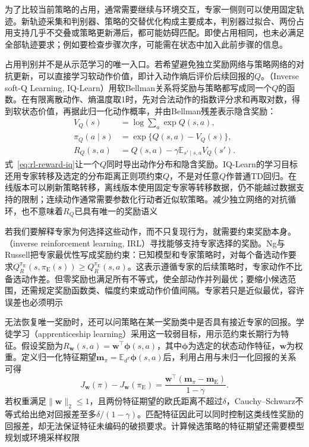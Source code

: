 为了比较当前策略的占用，通常需要继续与环境交互，专家一侧则可以使用固定轨迹。新轨迹采集和判别器、策略的交替优化构成主要成本，判别器过拟合、两份占用支持几乎不交叠或策略更新滞后，都可能妨碍匹配。即使占用相同，也未必满足全部轨迹要求；例如要检查步骤次序，可能需在状态中加入此前步骤的信息。

占用判别并不是从示范学习的唯一入口。若希望避免独立奖励网络与策略网络的对抗更新，可以直接学习软动作价值，即计入动作熵后评价后续回报的$Q$。（Inverse soft-Q Learning, IQ-Learn）用软Bellman关系将奖励与策略都写成同一个$Q$的函数。在有限离散动作、熵温度取1时，先对合法动作的指数评分求和再取对数，得到软状态价值，再据此归一化动作概率，并由Bellman残差表示隐含奖励：
\begin{equation}
  \begin{aligned}
    V_Q(s)&=\log\sum_a\exp Q(s,a),\\
    \pi_Q(a\mid s)&=\exp\{Q(s,a)-V_Q(s)\},\\
    R_Q(s,a)&=Q(s,a)-\gamma\mathbb E_{s'\mid s,a}V_Q(s').
  \end{aligned}
  \label{eq:rl-reward-iq}
\end{equation}
式~\eqref{eq:rl-reward-iq}让一个$Q$同时导出动作分布和隐含奖励。IQ-Learn的学习目标还用专家转移及选定的分布距离正则项约束$Q$，不是对任意$Q$作普通TD回归。在线版本可以刷新策略转移，离线版本使用固定专家等转移数据，仍不能越过数据支持的限制；连续动作通常需要参数化行动者近似软策略。减少独立网络的对抗循环，也不意味着$R_Q$已具有唯一的奖励语义

若我们要解释专家为何选择这些动作，而不只复现行为，就需要约束奖励本身。（inverse reinforcement learning, IRL）寻找能够支持专家选择的奖励。Ng与Russell把专家最优性写成奖励约束：已知模型和专家策略时，对每个备选动作要求$Q_R^{\pi_{\mathrm E}}(s,\pi_{\mathrm E}(s))\geq Q_R^{\pi_{\mathrm E}}(s,a)$。这表示遵循专家的后续策略时，专家动作不比备选动作差。但零奖励也满足所有不等式，使全部动作并列最优；要缩小候选范围，还需规定奖励函数类、幅度约束或动作价值间隔。专家若只是近似最优，容许误差也必须明示

无法恢复唯一奖励时，还可以问策略在某一奖励类中是否具有接近专家的回报。学徒学习（apprenticeship learning）采用这一较弱目标，用示范约束长期行为特征。假设奖励为$R_{\bm w}(s,a)=\bm w^\top\bm\phi(s,a)$，其中$\bm\phi$为选定的状态动作特征，$\bm w$为权重。定义归一化特征期望$\bm m_\pi=\mathbb E_{d^\pi}\bm\phi(s,a)$后，利用占用与未归一化回报的关系可得
\begin{equation}
  J_{\bm w}(\pi)-J_{\bm w}(\pi_{\mathrm E})
  =\frac{\bm w^\top(\bm m_\pi-\bm m_{\mathrm E})}{1-\gamma}.
  \label{eq:rl-reward-feature}
\end{equation}
若权重满足$\lVert\bm w\rVert_2\leq1$，且两份特征期望的欧氏距离不超过$\delta$，Cauchy--Schwarz不等式给出绝对回报差至多$\delta/(1-\gamma)$。匹配特征因此可以同时控制这类线性奖励的回报差，却无法保证特征未编码的破损要求。计算候选策略的特征期望还需要模型规划或环境采样权限

